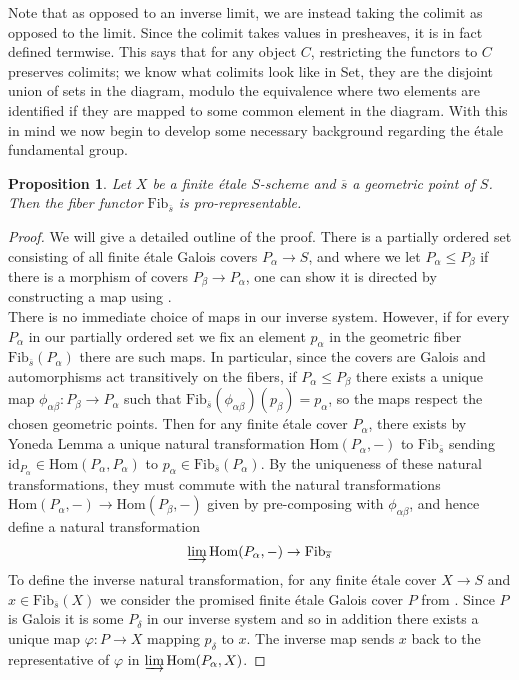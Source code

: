 \documentclass{article}
\theoremstyle{definition}
\theoremstyle{remark}
\theoremstyle{plain}
\newtheorem{proposition}[theorem]{Proposition}
\begin{document}
Note that as opposed to an inverse limit, we are instead taking the colimit as opposed to the limit.
Since the colimit takes values in presheaves, it is in fact defined termwise.
This says that for any object $C$, restricting the functors to $C$ preserves colimits; we know what colimits look like in Set, they are the disjoint union of sets in the diagram, modulo the equivalence where two elements are identified if they are mapped to some common element in the diagram. 
With this in mind we now begin to develop some necessary background regarding the \'etale fundamental group.

\begin{proposition}
	Let $X$ be a finite \'etale $S$-scheme and $\overline{s}$ a geometric point of $S$.
	Then the fiber functor $\text{Fib}_{\overline{s}}$ is pro-representable.
\end{proposition}

\begin{proof}
	We will give a detailed outline of the proof.
	There is a partially ordered set consisting of all finite \'etale Galois covers $P_{\alpha} \to S$, and where we let $P_{\alpha} \leq P_{\beta}$ if there is a morphism of covers $P_{\beta} \to P_{\alpha}$, one can show it is directed by constructing a map using .\\
	\indent There is no immediate choice of maps in our inverse system.
	However, if for every $P_{\alpha}$ in our partially ordered set we fix an element $p_{\alpha}$ in the geometric fiber $\text{Fib}_{\overline{s}}(P_{\alpha})$ there are such maps.
	In particular, since the covers are Galois and automorphisms act transitively on the fibers, if $P_{\alpha} \leq P_{\beta}$ there exists a unique map $\phi_{\alpha \beta}: P_{\beta} \to P_{\alpha}$ such that $\text{Fib}_{\overline{s}}(\phi_{\alpha \beta})(p_{\beta}) = p_{\alpha}$, so the maps respect the chosen geometric points.
	Then for any finite \'etale cover $P_{\alpha}$, there exists by Yoneda Lemma a unique natural transformation $\text{Hom}(P_{\alpha}, -)$ to $\text{Fib}_{\overline{s}}$ sending $\text{id}_{P_{\alpha}} \in \text{Hom}(P_{\alpha}, P_{\alpha})$ to $p_{\alpha} \in \text{Fib}_{\overline{s}}(P_{\alpha})$.
	By the uniqueness of these natural transformations, they must commute with the natural transformations $\text{Hom}(P_{\alpha}, -) \to \text{Hom}(P_{\beta}, -)$ given by pre-composing with $\phi_{\alpha \beta}$, and hence define a natural transformation
	\[\varinjlim \text{Hom}(P_{\alpha}, -) \to \text{Fib}_{\overline{s}}\]
	To define the inverse natural transformation, for any finite \'etale cover $X \to S$ and $x \in \text{Fib}_{\overline{s}}(X)$ we consider the promised finite \'etale Galois cover $P$ from .
	Since $P$ is Galois it is some $P_{\delta}$ in our inverse system and so in addition there exists a unique map $\varphi: P \to X$ mapping $p_{\delta}$ to $x$.
The inverse map sends $x$ back to the representative of $\varphi$ in $\varinjlim \text{Hom}(P_{\alpha}, X)$.

\end{proof}
\end{document}
